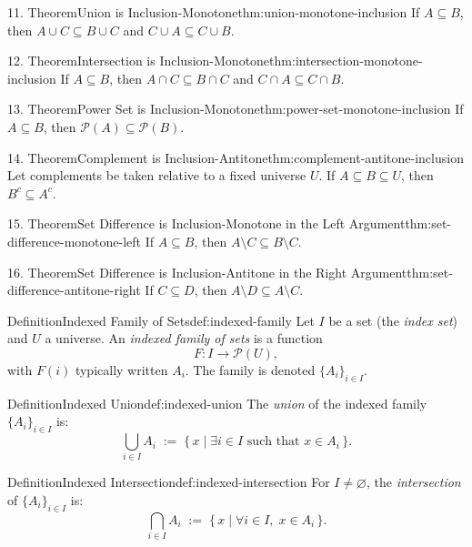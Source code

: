 \documentclass[11pt]{article}
\begin{document}
\begin{studyblock}{11. Theorem}{Union is Inclusion-Monotone}{thm:union-monotone-inclusion}
If $A\subseteq B$, then $A\cup C\subseteq B\cup C$ and
$C\cup A\subseteq C\cup B$.
\end{studyblock}
\begin{studyblock}{12. Theorem}{Intersection is Inclusion-Monotone}{thm:intersection-monotone-inclusion}
If $A\subseteq B$, then $A\cap C\subseteq B\cap C$ and
$C\cap A\subseteq C\cap B$.
\end{studyblock}
\begin{studyblock}{13. Theorem}{Power Set is Inclusion-Monotone}{thm:power-set-monotone-inclusion}
If $A\subseteq B$, then $\mathcal{P}(A)\subseteq\mathcal{P}(B)$.
\end{studyblock}
\begin{studyblock}{14. Theorem}{Complement is Inclusion-Antitone}{thm:complement-antitone-inclusion}
Let complements be taken relative to a fixed universe $U$. If
$A\subseteq B\subseteq U$, then $B^c\subseteq A^c$.
\end{studyblock}
\begin{studyblock}{15. Theorem}{Set Difference is Inclusion-Monotone in the Left Argument}{thm:set-difference-monotone-left}
If $A\subseteq B$, then $A\setminus C\subseteq B\setminus C$.
\end{studyblock}
\begin{studyblock}{16. Theorem}{Set Difference is Inclusion-Antitone in the Right Argument}{thm:set-difference-antitone-right}
If $C\subseteq D$, then $A\setminus D\subseteq A\setminus C$.
\end{studyblock}
\begin{studyblock}{Definition}{Indexed Family of Sets}{def:indexed-family}
Let $I$ be a set (the \emph{index set}) and $U$ a universe. An
\emph{indexed family of sets} is a function
\[
F : I \to \mathcal{P}(U),
\]
with $F(i)$ typically written $A_i$. The family is denoted $\{A_i\}_{i \in I}$.
\end{studyblock}
\begin{studyblock}{Definition}{Indexed Union}{def:indexed-union}
The \emph{union} of the indexed family $\{A_i\}_{i \in I}$ is:
\[
\bigcup_{i \in I} A_i
\;:=\;
\{\, x \mid \exists i \in I \text{ such that } x \in A_i \,\}.
\]
\end{studyblock}
\begin{studyblock}{Definition}{Indexed Intersection}{def:indexed-intersection}
For $I \neq \varnothing$, the \emph{intersection} of $\{A_i\}_{i \in I}$ is:
\[
\bigcap_{i \in I} A_i
\;:=\;
\{\, x \mid \forall i \in I,\; x \in A_i \,\}.
\]
\end{studyblock}
\end{document}
